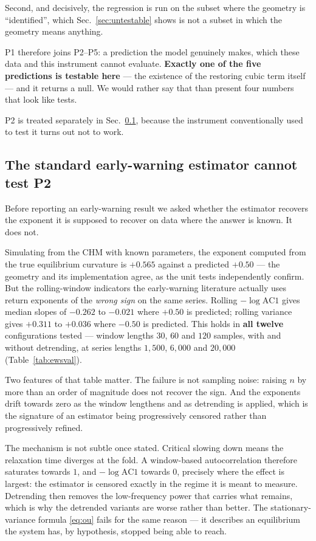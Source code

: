 \documentclass[conference]{IEEEtran}
\begin{document}
Second, and decisively, the regression is run on the subset where the geometry
is ``identified'', which Sec.~\ref{sec:untestable} shows is not a subset in
which the geometry means anything.

P1 therefore joins P2--P5: a prediction the model genuinely makes, which these
data and this instrument cannot evaluate. \textbf{Exactly one of the five
predictions is testable here} --- the existence of the restoring cubic term
itself --- and it returns a null. We would rather say that than present four
numbers that look like tests.

\noindent P2 is treated separately in Sec.~\ref{sec:ews-invalid}, because the
instrument conventionally used to test it turns out not to work.

\subsection{The standard early-warning estimator cannot test P2}
\label{sec:ews-invalid}

Before reporting an early-warning result we asked whether the estimator
recovers the exponent it is supposed to recover on data where the answer is
known. It does not.

Simulating from the CHM with known parameters, the exponent computed from the
true equilibrium curvature is $+0.565$ against a predicted $+0.50$ --- the
geometry and its implementation agree, as the unit tests independently confirm.
But the rolling-window indicators the early-warning literature actually uses
\cite{scheffer2009,dakos2012} return exponents of the \emph{wrong sign} on the
same series. Rolling $-\log\mathrm{AC1}$ gives median slopes of $-0.262$ to
$-0.021$ where $+0.50$ is predicted; rolling variance gives $+0.311$ to
$+0.036$ where $-0.50$ is predicted. This holds in \textbf{all twelve}
configurations tested --- window lengths $30$, $60$ and $120$ samples, with and
without detrending, at series lengths $1{,}500$, $6{,}000$ and $20{,}000$
(Table~\ref{tab:ewsval}).

Two features of that table matter. The failure is not sampling noise: raising
$n$ by more than an order of magnitude does not recover the sign. And the
exponents drift towards zero as the window lengthens and as detrending is
applied, which is the signature of an estimator being progressively censored
rather than progressively refined.

The mechanism is not subtle once stated. Critical slowing down means the
relaxation time diverges at the fold. A window-based autocorrelation therefore
saturates towards $1$, and $-\log\mathrm{AC1}$ towards $0$, precisely where the
effect is largest: the estimator is censored exactly in the regime it is meant
to measure. Detrending then removes the low-frequency power that carries what
remains, which is why the detrended variants are worse rather than better. The
stationary-variance formula \eqref{eq:ou} fails for the same reason --- it
describes an equilibrium the system has, by hypothesis, stopped being able to
reach.
\end{document}
